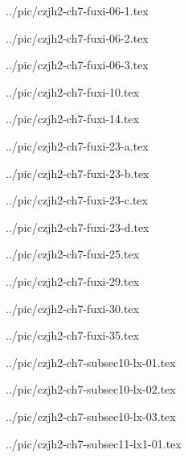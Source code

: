 ../pic/czjh2-ch7-fuxi-06-1.tex



../pic/czjh2-ch7-fuxi-06-2.tex



../pic/czjh2-ch7-fuxi-06-3.tex



../pic/czjh2-ch7-fuxi-10.tex



../pic/czjh2-ch7-fuxi-14.tex



../pic/czjh2-ch7-fuxi-23-a.tex



../pic/czjh2-ch7-fuxi-23-b.tex



../pic/czjh2-ch7-fuxi-23-c.tex



../pic/czjh2-ch7-fuxi-23-d.tex



../pic/czjh2-ch7-fuxi-25.tex



../pic/czjh2-ch7-fuxi-29.tex



../pic/czjh2-ch7-fuxi-30.tex



../pic/czjh2-ch7-fuxi-35.tex



../pic/czjh2-ch7-subsec10-lx-01.tex



../pic/czjh2-ch7-subsec10-lx-02.tex



../pic/czjh2-ch7-subsec10-lx-03.tex



../pic/czjh2-ch7-subsec11-lx1-01.tex



